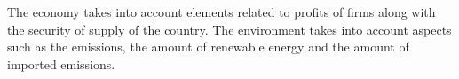 The economy takes into account elements related to profits of firms along with the security of supply of the country. The environment takes into account aspects such as the emissions, the amount of renewable energy and the amount of imported emissions.



